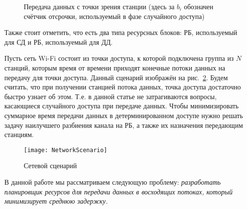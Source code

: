 \begin{figure}[h]
\begin{scaletikzpicturetowidth}{\textwidth}
	\end{scaletikzpicturetowidth}
	\caption{\label{fig:STAprocess} Передача данных с точки зрения станции (здесь за $b_i$ обозначен счётчик отсрочки, используемый в фазе случайного доступа)}
\end{figure}

\vspace{-\baselineskip}
Также стоит отметить, что есть два типа ресурсных блоков: РБ, используемый для СД и РБ, используемый для ДД.

Пусть сеть Wi-Fi состоит из точки доступа, к которой подключена группа из $N$ станций, которым время от времени приходят конечные потоки данных на передачу для точки доступа.  Данный сценарий изображён на рис.~\ref{fig:scenario}. Будем считать, что при получении станцией потока данных, точка доступа достаточно быстро узнает об этом. Т.е. в данной статье не затрагиваются вопросы, касающиеся случайного доступа при передаче данных.  Чтобы минимизировать суммарное время передачи данных в детерминированном доступе нужно решать задачу наилучшего разбиения канала на РБ, а также их назначения передающим станциям. 
\begin{figure}[!t]
\center
\texttt{[image: NetworkScenario]}
\caption{\label{fig:scenario} Сетевой сценарий}
\end{figure}

В данной работе мы рассматриваем следующую проблему: \textit{разработать планировщик ресурсов для передачи данных в восходящих потоках, который минимизирует среднюю задержку. }
